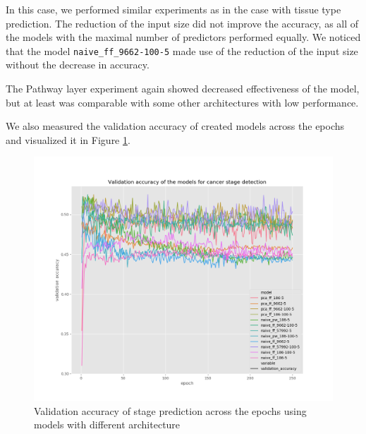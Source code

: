 In this case, we performed similar experiments as in the case with tissue type prediction.
The reduction of the input size did not improve the accuracy, as all of the models with the maximal number of predictors performed equally.
We noticed that the model \verb'naive_ff_9662-100-5' made use of the reduction of the input size without the decrease in accuracy.

The Pathway layer experiment again showed decreased effectiveness of the model, but at least was comparable with some other architectures with low performance.

We also measured the validation accuracy of created models across the epochs and visualized it in Figure \ref{fig:val_acc_st}.

\begin{figure}
    \centering
    \includegraphics[width=\linewidth]{images/val_acc_st_v2.png}
    \caption[Validation accuracy - stage]{Validation accuracy of stage prediction across the epochs using models with different architecture}
    \label{fig:val_acc_st}
\end{figure}

